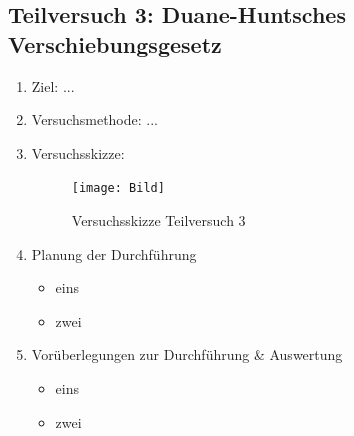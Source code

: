 \documentclass{article}
\begin{document}
\subsection{Teilversuch 3: Duane-Huntsches Verschiebungsgesetz}
\begin{enumerate}[label = (\Roman*)]
    \item Ziel: ...
    
    \item Versuchsmethode: ...
    
    \item Versuchsskizze:
    
        \begin{figure}[H]
        \centering
        \texttt{[image: Bild]}
        \caption{Versuchsskizze Teilversuch 3}
        \end{figure}

    \item Planung der Durchführung
        \begin{itemize}
            \item eins
            \item zwei
        \end{itemize}

    \item Vorüberlegungen zur Durchführung \& Auswertung
        \begin{itemize}
            \item eins
            \item zwei
        \end{itemize}
    
\end{enumerate}


\newpage
\end{document}

